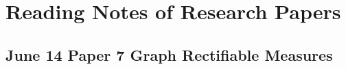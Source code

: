 \section{Reading Notes of Research Papers}

\subsection{June 14 Paper \texorpdfstring{\cite{naples2020}}{Lg} 7 Graph Rectifiable Measures}
